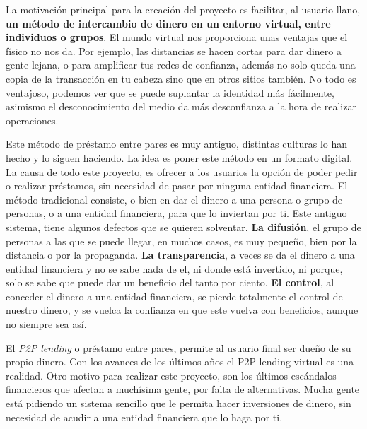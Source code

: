 \documentclass[a4paper, 12pt]{book}
\begin{document}
La motivación principal para la creación del proyecto es facilitar, al usuario 
llano, \textbf{un método de intercambio de dinero en un entorno virtual, entre 
individuos o grupos}. El mundo virtual nos proporciona unas ventajas que el 
físico no nos da. Por ejemplo, las distancias se hacen cortas para dar dinero a 
gente lejana, o para amplificar tus redes de confianza, además no solo queda 
una copia de la transacción en tu cabeza sino que en otros sitios también. No 
todo es ventajoso, podemos ver que se puede suplantar la identidad más 
fácilmente, asimismo el desconocimiento del medio da más desconfianza a la hora 
de realizar operaciones. 

Este método de préstamo entre pares es muy antiguo, distintas culturas lo han 
hecho y lo siguen haciendo. La idea es poner este método en un formato digital. 
La causa de todo este proyecto, es ofrecer a los usuarios la opción de poder 
pedir o realizar préstamos, sin necesidad de pasar por ninguna entidad 
financiera. El método tradicional consiste, o bien en dar el dinero a una 
persona o grupo de personas, o a una entidad financiera, para que lo inviertan 
por ti. Este antiguo sistema, tiene algunos defectos que se quieren 
solventar. \textbf{La difusión}, el grupo de personas a las que se puede llegar, 
en muchos casos, es muy pequeño, bien por la distancia o por la propaganda. 
\textbf{La transparencia}, a veces se da el dinero a una entidad financiera y 
no se sabe nada de el, ni donde está invertido, ni porque, solo se sabe que 
puede dar un beneficio del tanto por ciento. \textbf{El control}, al conceder 
el dinero a una entidad financiera, se pierde totalmente el control de nuestro 
dinero, y se vuelca la confianza en que este vuelva con beneficios, aunque no 
siempre sea así.

El \textit{P2P lending} o préstamo entre pares, permite al usuario final ser 
dueño de su propio dinero. Con los avances de los últimos años el P2P lending 
virtual es una realidad. Otro motivo para realizar este proyecto, son los 
últimos escándalos financieros que afectan a muchísima gente, por falta de 
alternativas. Mucha gente está pidiendo un sistema sencillo que le permita 
hacer inversiones de dinero, sin necesidad de acudir a una entidad financiera 
que lo haga por ti. 
\end{document}
